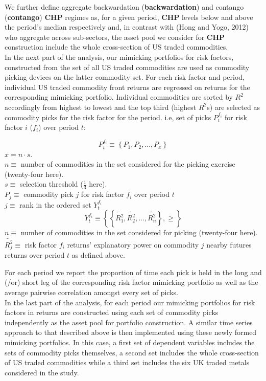 \documentclass[]{elsarticle} %
\begin{document}
We further define aggregate backwardation (\textbf{backwardation}) and contango (\textbf{contango}) \textbf{CHP} regimes as, for a given period, \textbf{CHP} levels below and above the period's median respectively and, in contrast with (Hong and Yogo, 2012) who aggregate across sub-sectors, the asset pool we consider for \textbf{CHP} construction include the whole cross-section of US traded commodities.\\
In the next part of the analysis, our mimicking portfolios for risk factors, constructed from the set of all US traded commodities are used as commodity picking devices on the latter commodity set. For each risk factor and period, individual US traded commodity front returns are regressed on returns for the corresponding mimicking portfolio. Individual commodities are sorted by \(R^{2}\) accordingly from highest to lowest and the top third (highest \(R^{2}\)s) are selected as commodity picks for the risk factor for the period. i.e, set of picks \(P_{t}^{f_{i}}\) for risk factor \(i\) (\(f_{i}\)) over period \(t\):

\[P_{t}^{f_{i}}\equiv\left \{ P_{1}, P_{2}, ..., P_{x} \right \}\]
\(x = n \cdot s\).\\
\(n\equiv\) number of commodities in the set considered for the picking exercise (twenty-four here).\\
\(s\equiv\) selection threshold (\(\frac{1}{3}\) here).\\
\(P_{j}\equiv\) commodity pick \(j\) for risk factor \(f_{i}\) over period \(t\)\\
\(j\equiv\) rank in the ordered set \(Y_{t}^{f_{i}}\)\\
\[Y_{t}^{f_{i}}\equiv\left \{ \left \{ \tilde{R_{1}^{2}}, \tilde{R_{2}^{2}}, ..., \tilde{R_{n}^{2}} \right \}, \geq \right \}\]
\(n\equiv\) number of commodities in the set considered for picking (twenty-four here).\\
\(\tilde{R_{j}^{2}}\equiv\) risk factor \(f_{i}\) returns' explanatory power on commodity \(j\) nearby futures returns over period \(t\) as defined above.

\bigskip

For each period we report the proportion of time each pick is held in the long and (/or) short leg of the corresponding risk factor mimicking portfolio as well as the average pairwise correlation amongst every set of picks.\\
In the last part of the analysis, for each period our mimicking portfolios for risk factors in returns are constructed using each set of commodity picks independently as the asset pool for portfolio construction. A similar time series approach to that described above is then implemented using these newly formed mimicking portfolios. In this case, a first set of dependent variables includes the sets of commodity picks themselves, a second set includes the whole cross-section of US traded commodities while a third set includes the six UK traded metals considered in the study.
\end{document}
